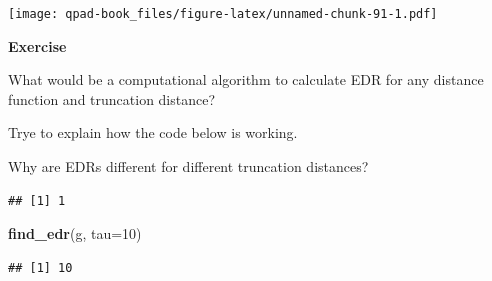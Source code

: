 \documentclass[12pt,]{book}
\newenvironment{Shaded}{\begin{snugshade}}{\end{snugshade}}
\newcommand{\CommentTok}[1]{\textcolor[rgb]{0.56,0.35,0.01}{\textit{#1}}}
\newcommand{\ControlFlowTok}[1]{\textcolor[rgb]{0.13,0.29,0.53}{\textbf{#1}}}
\newcommand{\DataTypeTok}[1]{\textcolor[rgb]{0.13,0.29,0.53}{#1}}
\newcommand{\DecValTok}[1]{\textcolor[rgb]{0.00,0.00,0.81}{#1}}
\newcommand{\KeywordTok}[1]{\textcolor[rgb]{0.13,0.29,0.53}{\textbf{#1}}}
\newcommand{\NormalTok}[1]{#1}
\newcommand{\OperatorTok}[1]{\textcolor[rgb]{0.81,0.36,0.00}{\textbf{#1}}}
\newcommand{\OtherTok}[1]{\textcolor[rgb]{0.56,0.35,0.01}{#1}}
\newcommand{\StringTok}[1]{\textcolor[rgb]{0.31,0.60,0.02}{#1}}
\let\BeginKnitrBlock\begin \let\EndKnitrBlock\end
\begin{document}
\texttt{[image: qpad-book\_files/figure-latex/unnamed-chunk-91-1.pdf]}

\BeginKnitrBlock{rmdexercise}
\textbf{Exercise}

What would be a computational algorithm to calculate EDR
for any distance function and truncation distance?

Trye to explain how the code below is working.

Why are EDRs different for different truncation distances?
\EndKnitrBlock{rmdexercise}

\begin{Shaded}
\end{Shaded}

\begin{verbatim}
## [1] 1
\end{verbatim}

\begin{Shaded}
\begin{Highlighting}[]
\KeywordTok{find_edr}\NormalTok{(g, }\DataTypeTok{tau=}\DecValTok{10}\NormalTok{)}
\end{Highlighting}
\end{Shaded}

\begin{verbatim}
## [1] 10
\end{verbatim}
\end{document}
